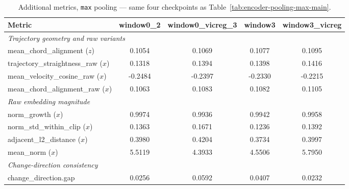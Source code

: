 \begin{table}[H]
\centering
\caption{Additional metrics, \texttt{max} pooling --- same four checkpoints as
Table~\ref{tab:encoder-pooling-max-main}.}
\label{tab:encoder-pooling-max-additional}
\begin{tabular}{lcccc}
\toprule
Metric & window0\_2 & window0\_vicreg\_3 & window3 & window3\_vicreg \\
\midrule
\multicolumn{5}{l}{\textit{Trajectory geometry and raw variants}} \\
mean\_chord\_alignment ($z$) & 0.1054 & 0.1069 & 0.1077 & 0.1095 \\
trajectory\_straightness\_raw ($x$) & 0.1318 & 0.1394 & 0.1398 & 0.1416 \\
mean\_velocity\_cosine\_raw ($x$) & -0.2484 & -0.2397 & -0.2330 & -0.2215 \\
mean\_chord\_alignment\_raw ($x$) & 0.1063 & 0.1083 & 0.1082 & 0.1105 \\
\midrule
\multicolumn{5}{l}{\textit{Raw embedding magnitude}} \\
norm\_growth ($x$) & 0.9974 & 0.9936 & 0.9942 & 0.9958 \\
norm\_std\_within\_clip ($x$) & 0.1363 & 0.1671 & 0.1236 & 0.1392 \\
adjacent\_l2\_distance ($x$) & 0.3980 & 0.4204 & 0.3734 & 0.3997 \\
mean\_norm ($x$) & 5.5119 & 4.3933 & 4.5506 & 5.7950 \\
\midrule
\multicolumn{5}{l}{\textit{Change-direction consistency}} \\
change\_direction.gap & 0.0256 & 0.0592 & 0.0407 & 0.0232 \\
\bottomrule
\end{tabular}
\end{table}

